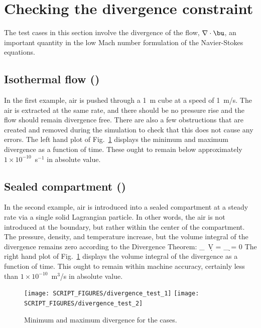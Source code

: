 \documentclass[11pt]{book}
\begin{document}
\newpage

\section{Checking the divergence constraint}
\label{divergence_test}

The test cases in this section involve the divergence of the flow, $\nabla \cdot \bu$, an important quantity in the low Mach number formulation of the Navier-Stokes equations.

\subsection{Isothermal flow (\texorpdfstring{}{divergence\_test\_1})}
\label{divergence_test_1}

In the first example, air is pushed through a 1~m cube at a speed of 1~m/s. The air is extracted at the same rate, and there should be no pressure rise and the flow should remain divergence free. There are also a few obstructions that are created and removed during the simulation to check that this does not cause any errors. The left hand plot of Fig.~\ref{divergence_test_fig} displays the minimum and maximum divergence as a function of time. These ought to remain below approximately $1 \times 10^{-10}$~s$^{-1}$ in absolute value.

\subsection{Sealed compartment (\texorpdfstring{}{divergence\_test\_2})}
\label{divergence_test_2}

In the second example, air is introduced into a sealed compartment at a steady rate via a single solid Lagrangian particle. In other words, the air is not introduced at the boundary, but rather within the center of the compartment. The pressure, density, and temperature increase, but the volume integral of the divergence remains zero according to the Divergence Theorem:
\be
   \int_\Omega \nabla \cdot \bu \, \d V = \int_{\partial \Omega} \bu \cdot \d \bS = 0
\ee
The right hand plot of Fig.~\ref{divergence_test_fig} displays the volume integral of the divergence as a function of time. This ought to remain within machine accuracy, certainly less than $1 \times 10^{-10}$~m$^3$/s in absolute value.

\begin{figure}[!ht]
\texttt{[image: SCRIPT\_FIGURES/divergence\_test\_1]}
\texttt{[image: SCRIPT\_FIGURES/divergence\_test\_2]}
\caption[The  cases 1 and 2]{Minimum and maximum divergence for the  cases.}
\label{divergence_test_fig}
\end{figure}
\end{document}
